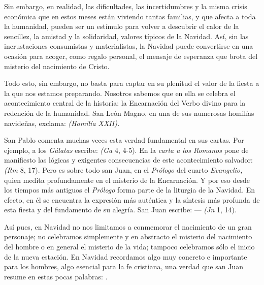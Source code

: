 \begin{body}
\begin{body}
Sin embargo, en realidad, las dificultades, las incertidumbres y la misma crisis económica que en estos meses están viviendo tantas familias, y que afecta a toda la humanidad, pueden ser un estímulo para volver a descubrir el calor de la sencillez, la amistad y la solidaridad, valores típicos de la Navidad. Así, sin las incrustaciones consumistas y materialistas, la Navidad puede convertirse en una ocasión para acoger, como regalo personal, el mensaje de esperanza que brota del misterio del nacimiento de Cristo.

Todo esto, sin embargo, no basta para captar en su plenitud el valor de la fiesta a la que nos estamos preparando. Nosotros sabemos que en ella se celebra el acontecimiento central de la historia: la Encarnación del Verbo divino para la redención de la humanidad. San León Magno, en una de sus numerosas homilías navideñas, exclama:  \emph{(Homilía XXII). }

San Pablo comenta muchas veces esta verdad fundamental en sus cartas. Por ejemplo, a los \emph{Gálatas} escribe:  \emph{(Ga} 4, 4-5). En la \emph{carta a los Romanos} pone de manifiesto las lógicas y exigentes consecuencias de este acontecimiento salvador:  \emph{(Rm} 8, 17). Pero es sobre todo san Juan, en el \emph{Prólogo} del cuarto \emph{Evangelio,} quien medita profundamente en el misterio de la Encarnación. Y por eso desde los tiempos más antiguos el \emph{Prólogo} forma parte de la liturgia de la Navidad. En efecto, en él se encuentra la expresión más auténtica y la síntesis más profunda de esta fiesta y del fundamento de su alegría. San Juan escribe:  ---  \emph{(Jn} 1, 14).

Así pues, en Navidad no nos limitamos a conmemorar el nacimiento de un gran personaje; no celebramos simplemente y en abstracto el misterio del nacimiento del hombre o en general el misterio de la vida; tampoco celebramos sólo el inicio de la nueva estación. En Navidad recordamos algo muy concreto e importante para los hombres, algo esencial para la fe cristiana, una verdad que san Juan resume en estas pocas palabras: .


\end{body}
\end{body}
